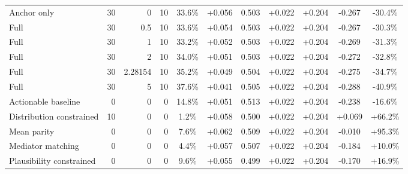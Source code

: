 \begin{table}[htbp]
\begin{tabular}{lrrrccccccc}
Anchor only & 30 & 0 & 10 & 33.6\% & +0.056 & 0.503 & +0.022 & +0.204 & -0.267 & -30.4\% \\
Full & 30 & 0.5 & 10 & 33.6\% & +0.054 & 0.503 & +0.022 & +0.204 & -0.267 & -30.3\% \\
Full & 30 & 1 & 10 & 33.2\% & +0.052 & 0.503 & +0.022 & +0.204 & -0.269 & -31.3\% \\
Full & 30 & 2 & 10 & 34.0\% & +0.051 & 0.503 & +0.022 & +0.204 & -0.272 & -32.8\% \\
Full & 30 & 2.28154 & 10 & 35.2\% & +0.049 & 0.504 & +0.022 & +0.204 & -0.275 & -34.7\% \\
Full & 30 & 5 & 10 & 37.6\% & +0.041 & 0.505 & +0.022 & +0.204 & -0.288 & -40.9\% \\
Actionable baseline & 0 & 0 & 0 & 14.8\% & +0.051 & 0.513 & +0.022 & +0.204 & -0.238 & -16.6\% \\
Distribution constrained & 10 & 0 & 0 & 1.2\% & +0.058 & 0.500 & +0.022 & +0.204 & +0.069 & +66.2\% \\
Mean parity & 0 & 0 & 0 & 7.6\% & +0.062 & 0.509 & +0.022 & +0.204 & -0.010 & +95.3\% \\
Mediator matching & 0 & 0 & 0 & 4.4\% & +0.057 & 0.507 & +0.022 & +0.204 & -0.184 & +10.0\% \\
Plausibility constrained & 0 & 0 & 0 & 9.6\% & +0.055 & 0.499 & +0.022 & +0.204 & -0.170 & +16.9\% \\
\bottomrule
\end{tabular}
\end{table}